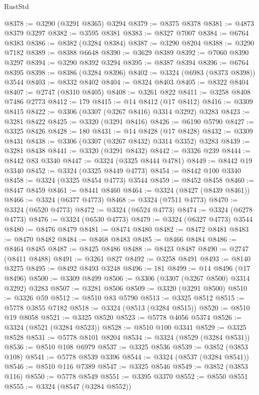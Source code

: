 \begin{lexlean}{RustStd}
\begin{coremodule}
@8378 := @3290 (@3291 @8365) @3294
@8379 := @8375 @8378
@8381 := @4873 @8379 @3297
@8382 := @3595 @8381
@8383 := @8327 @7007
@8384 := @6764 @8383
@8386 := @8382 (@3284 @8384)
@8387 := @3290 @8204
@8388 := @3290 @7182
@8389 := @8388 @6648
@8390 := @3629 @8389
@8392 := @7060 @8390 @3297
@8394 := @3290 @8392 @3294
@8395 := @8387 @8394
@8396 := @6764 @8395
@8398 := @8386 (@3284 @8396)
@8402 := @3324 (@6983 (@8373 @8398)) @3544
@8403 := @8332 @8402
@8404 := @8324 @8403
@8405 := @8322 @8404
@8407 := @2747 (@8310 @8405)
@8408 := @3261 @822
@8411 := @3258 @8408 @7486 @2773
@8412 := 179
@8415 := @14 @8412 (@17 @8412)
@8416 := @3309 @8415
@8422 := @3306 (@3307 (@3267 @8416) @3314 @3292) @3283
@8423 := @3281 @8422
@8425 := @3320 (@3291 @8416)
@8426 := @6190 @5790
@8427 := @3325 @8426
@8428 := 180
@8431 := @14 @8428 (@17 @8428)
@8432 := @3309 @8431
@8438 := @3306 (@3307 (@3267 @8432) @3314 @3352) @3283
@8439 := @3281 @8438
@8441 := @3320 (@3291 @8432)
@8442 := @3326 @239
@8444 := @8442 @83 @3340
@8447 := @3324 (@3325 @8444 @4781)
@8449 := @8442 @19 @3340
@8452 := @3324 (@3325 @8449 @4773)
@8454 := @8442 @100 @3340
@8458 := @3324 (@3325 @8454 @4773) @3544
@8459 := @8452 @8458
@8460 := @8447 @8459
@8461 := @8441 @8460
@8464 := @3324 (@8427 (@8439 @8461))
@8466 := @3324 (@6377 @4773)
@8468 := @3324 (@7511 @4773)
@8470 := @3324 (@6520 @4773)
@8472 := @3324 (@6524 @4773)
@8474 := @3324 (@6278 @4773)
@8476 := @3324 (@6530 @4773)
@8479 := @3324 (@6327 @4773) @3544
@8480 := @8476 @8479
@8481 := @8474 @8480
@8482 := @8472 @8481
@8483 := @8470 @8482
@8484 := @8468 @8483
@8485 := @8466 @8484
@8486 := @8464 @8485
@8487 := @8425 @8486
@8488 := @8423 @8487
@8490 := @2747 (@8411 @8488)
@8491 := @3261 @827
@8492 := @3258 @8491
@8493 := @8140 @3275
@8495 := @8492 @8493 @3248
@8496 := 181
@8499 := @14 @8496 (@17 @8496)
@8500 := @3309 @8499
@8506 := @3306 (@3307 (@3267 @8500) @3314 @3292) @3283
@8507 := @3281 @8506
@8509 := @3320 (@3291 @8500)
@8510 := @3326 @59
@8512 := @8510 @83 @5790
@8513 := @3325 @8512
@8515 := @5778 @3855 @7182
@8518 := @3324 (@8513 (@3284 @8515))
@8520 := @8510 @19 @8058
@8521 := @3325 @8520
@8523 := @5778 @4056 @5374
@8526 := @3324 (@8521 (@3284 @8523))
@8528 := @8510 @100 @3341
@8529 := @3325 @8528
@8531 := @5778 @8101 @8204
@8534 := @3324 (@8529 (@3284 @8531))
@8536 := @8510 @108 @6979
@8537 := @3325 @8536
@8539 := @3852 (@3853 @108)
@8541 := @5778 @8539 @3396
@8544 := @3324 (@8537 (@3284 @8541))
@8546 := @8510 @116 @7389
@8547 := @3325 @8546
@8549 := @3852 (@3853 @116)
@8550 := @5778 @8549
@8551 := @3395 @3370
@8552 := @8550 @8551
@8555 := @3324 (@8547 (@3284 @8552))

\end{coremodule}
\end{lexlean}

